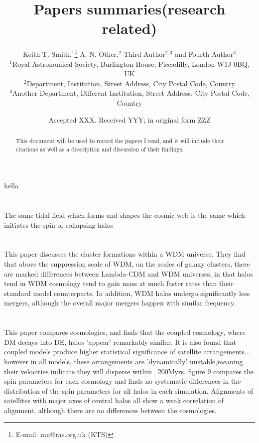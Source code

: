 \documentclass[fleqn,usenatbib]{mnras}
\title[Paper summaries (research related)]{Papers summaries(research related)}
\author[K. T. Smith et al.]{
Keith T. Smith,$^{1}$\thanks{E-mail: mn@ras.org.uk (KTS)}
A. N. Other,$^{2}$
Third Author$^{2,3}$
and Fourth Author$^{3}$
\\
$^{1}$Royal Astronomical Society, Burlington House, Piccadilly, London W1J 0BQ, UK\\
$^{2}$Department, Institution, Street Address, City Postal Code, Country\\
$^{3}$Another Department, Different Institution, Street Address, City Postal Code, Country
}
\date{Accepted XXX. Received YYY; in original form ZZZ}
\begin{document}
\label{firstpage}
\pagerange{\pageref{firstpage}--\pageref{lastpage}}
\maketitle

\begin{abstract}
This document will be used to record the papers I read, and it will include their citations as well as a description and discussion of their findings.
\end{abstract}

\begin{keywords}
hello
\end{keywords}







\section{\citet{Veena_18}}
 The same tidal field which forms and shapes the cosmic web is the same which initiates the spin of collapsing halos

\section{\citet{Elahi_14}}
This paper discusses the cluster formations within a WDM universe. They find that above the suppression scale of WDM, on the scales of galaxy clusters, there are marked differences between Lambda-CDM and WDM universes, in that halos tend in WDM cosmology tend to gain mass at much faster rates than their standard model counterparts. In addition, WDM halos undergo significantly less mergers, although the overall major mergers happen with similar frequency. 

\section{\citet{Elahi_15}}
This paper compares cosmologies, and finds that the coupled cosmology, where DM decays into DE, halos 'appear' remarkably similar. It is also found that coupled models produce higher statistical significance of satellite arrangements... however in all models, these arrangements are 'dynamically' unstable,meaning their velocities indicate they will disperse within ~200Myrs. figure 9 compares the spin parameters for each cosmology and finds no systematic differences in the distribution of the spin parameters for all halos in each simulation. Alignments of satellites with major axes of central halos all show a weak correlation of alignment, although there are no differences between the cosmologies. 
\end{document}
